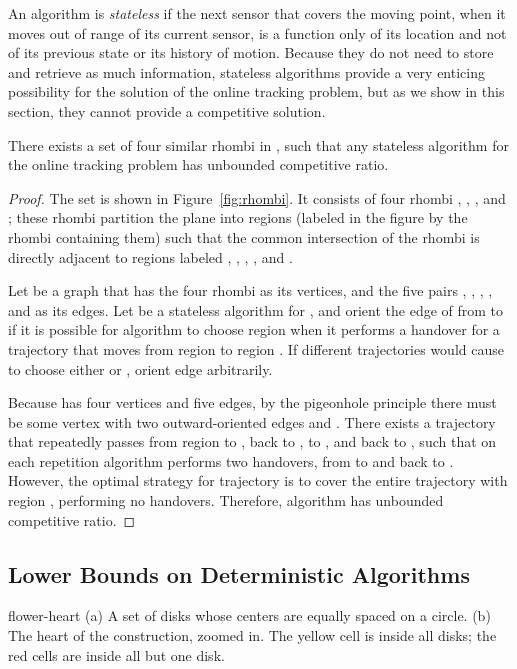 \documentclass[runningheads]{llncs}
\begin{document}
An algorithm is \emph{stateless} if the next sensor that covers the moving point, when it moves out of range of its current sensor, is a function only of its location and not of its previous state or its history of motion. Because they do not need to store and retrieve as much information, stateless algorithms provide a very enticing possibility for the solution of the online tracking problem, but as we show in this section, they cannot provide a competitive solution.

\begin{theorem}  \label {thm:lowerbound_stateless}
There exists a set  of four similar rhombi in , such that any stateless algorithm for the online tracking problem has unbounded competitive ratio.
\end{theorem}

\begin{proof}
The set  is shown in Figure~\ref{fig:rhombi}. It consists of four rhombi , , , and ; these rhombi partition the plane into regions (labeled in the figure by the rhombi containing them) such that the common intersection  of the rhombi is directly adjacent to regions labeled , , , , and .

Let  be a graph that has the four rhombi as its vertices, and the five pairs , , , , and  as its edges. Let  be a stateless algorithm for , and orient the edge  of  from  to  if it is possible for algorithm  to choose region  when it performs a handover for a trajectory that moves from region  to region . If different trajectories would cause  to choose either  or , orient edge  arbitrarily.

Because  has four vertices and five edges, by the pigeonhole principle there must be some vertex  with two outward-oriented edges  and . There exists a trajectory  that repeatedly passes from region  to , back to , to , and back to , such that on each repetition algorithm  performs two handovers, from  to  and back to . However, the optimal strategy for trajectory  is to cover the entire trajectory with region , performing no handovers. Therefore, algorithm  has unbounded competitive ratio.
\end{proof}

\subsection{Lower Bounds on Deterministic Algorithms}
 {flower-heart} {(a) A set of  disks whose centers are equally spaced on a circle. (b) The heart of the construction, zoomed in. The yellow cell is inside all disks; the red cells are inside all but one disk.}
\end{document}
